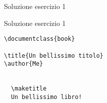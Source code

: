 \begin{frame}[fragile]{Soluzione esercizio 1}

\begin{soluzione}{Soluzione esercizio 1}
\begin{code}
\begin{verbatim}
\documentclass{book}

\title{Un bellissimo titolo}
\author{Me}


  \maketitle
  Un bellissimo libro!

\end{verbatim}
\end{code}
\end{soluzione}

\end{frame}